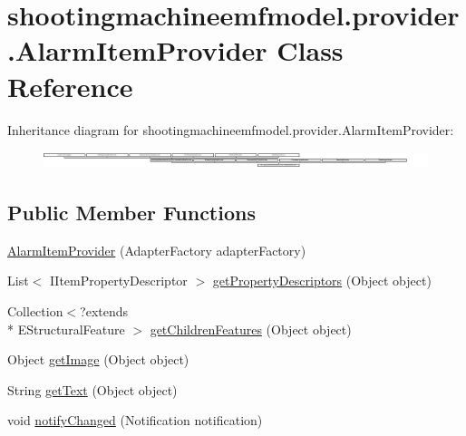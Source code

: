 \hypertarget{classshootingmachineemfmodel_1_1provider_1_1_alarm_item_provider}{\section{shootingmachineemfmodel.\-provider.\-Alarm\-Item\-Provider Class Reference}
\label{classshootingmachineemfmodel_1_1provider_1_1_alarm_item_provider}
}
Inheritance diagram for shootingmachineemfmodel.\-provider.\-Alarm\-Item\-Provider\-:\begin{figure}[H]
\begin{center}
\leavevmode
\includegraphics[height=0.499109cm]{classshootingmachineemfmodel_1_1provider_1_1_alarm_item_provider}
\end{center}
\end{figure}
\subsection*{Public Member Functions}
\begin{DoxyCompactItemize}
\item 
\hyperlink{classshootingmachineemfmodel_1_1provider_1_1_alarm_item_provider_a379202ec81c1a69f5e8e2587c345dfe2}{Alarm\-Item\-Provider} (Adapter\-Factory adapter\-Factory)
\item 
List$<$ I\-Item\-Property\-Descriptor $>$ \hyperlink{classshootingmachineemfmodel_1_1provider_1_1_alarm_item_provider_a4c477416f05cba19bcec16668a8ec939}{get\-Property\-Descriptors} (Object object)
\item 
Collection$<$?extends \\*
E\-Structural\-Feature $>$ \hyperlink{classshootingmachineemfmodel_1_1provider_1_1_alarm_item_provider_a4427a80866403958b94f03c1587557e4}{get\-Children\-Features} (Object object)
\item 
Object \hyperlink{classshootingmachineemfmodel_1_1provider_1_1_alarm_item_provider_a8e53f712992608c54d862dedbc668a0b}{get\-Image} (Object object)
\item 
String \hyperlink{classshootingmachineemfmodel_1_1provider_1_1_alarm_item_provider_a3a878d5bf2baf7cee3584421d5114df2}{get\-Text} (Object object)
\item 
void \hyperlink{classshootingmachineemfmodel_1_1provider_1_1_alarm_item_provider_a33ebc8d99bc4db1b9a8f1fcbc1dfb197}{notify\-Changed} (Notification notification)
\end{DoxyCompactItemize}
